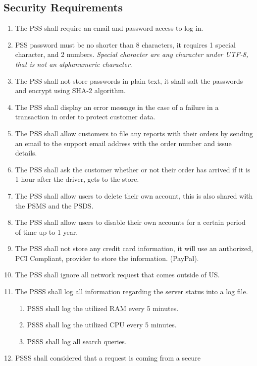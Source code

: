 \subsection{Security Requirements}
\begin{enumerate}[label=SEC-\arabic*]
    \item The PSS shall require an email and password access to log in.
    \item PSS password must be no shorter than 8 characters, it requires
    1 special character, and 2 numbers. \textit{Special character are 
    any character under UTF-8, that is not an alphanumeric character}.
    \item The PSS shall not store passwords in plain text, it shall salt the 
    passwords and encrypt using SHA-2 algorithm.
    \item The PSS shall display an error message in the case of a failure in a 
    transaction in order to protect customer data.
    \item The PSS shall allow customers to file any reports with their orders 
    by sending an email to the support email address with the order number and 
    issue details.
    \item The PSS shall ask the customer whether or not their order has arrived 
    if it is 1 hour after the driver, gets to the store.
    \item The PSS shall allow users to delete their own account, this is also 
    shared with the PSMS and the PSDS.
    \item The PSS shall allow users to disable their own accounts for a certain 
    period of time up to 1 year.
    \item The PSS shall not store any credit card information, it will use an 
    authorized, PCI Compliant, provider to store the information. (PayPal).
    \item The PSS shall ignore all network request that comes outside of US.
    \item The PSSS shall log all information regarding the server status 
    into a log file.
    \begin{enumerate}[label=SEC-11.\arabic*]
        \item PSSS shall log the utilized RAM every 5 minutes. 
        \item PSSS shall log the utilized CPU every 5 minutes.
        \item PSSS shall log all search queries.
    \end{enumerate}
    \item PSSS shall considered that a request is coming from a secure 

\end{enumerate}
